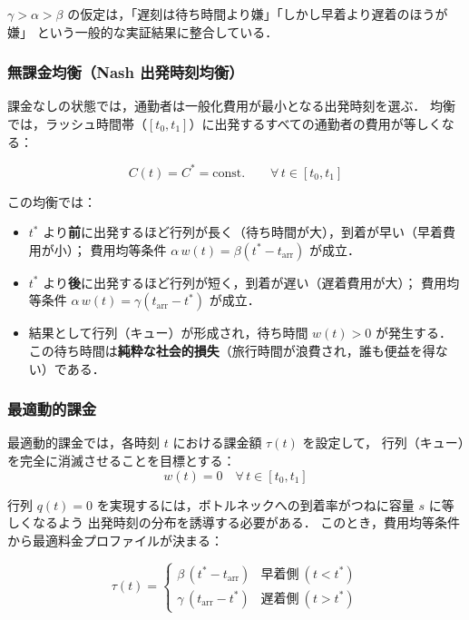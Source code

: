 $\gamma > \alpha > \beta$ の仮定は，「遅刻は待ち時間より嫌」「しかし早着より遅着のほうが嫌」
という一般的な実証結果に整合している．

\subsubsection*{無課金均衡（Nash 出発時刻均衡）}

課金なしの状態では，通勤者は一般化費用が最小となる出発時刻を選ぶ．
均衡では，ラッシュ時間帯（$[t_0, t_1]$）に出発するすべての通勤者の費用が等しくなる：

\begin{equation}
  C(t) = C^* = \text{const.}
  \qquad \forall\, t \in [t_0, t_1]
  \label{eq:departure-equilibrium}
\end{equation}

この均衡では：
\begin{itemize}
  \item $t^*$ より\textbf{前}に出発するほど行列が長く（待ち時間が大），到着が早い（早着費用が小）；
        費用均等条件 $\alpha\, w(t) = \beta(t^* - t_{\text{arr}})$ が成立．
  \item $t^*$ より\textbf{後}に出発するほど行列が短く，到着が遅い（遅着費用が大）；
        費用均等条件 $\alpha\, w(t) = \gamma(t_{\text{arr}} - t^*)$ が成立．
  \item 結果として行列（キュー）が形成され，待ち時間 $w(t) > 0$ が発生する．
        この待ち時間は\textbf{純粋な社会的損失}（旅行時間が浪費され，誰も便益を得ない）である．
\end{itemize}

\subsubsection*{最適動的課金}

最適動的課金では，各時刻 $t$ における課金額 $\tau(t)$ を設定して，
行列（キュー）を完全に消滅させることを目標とする：
\begin{equation}
  w(t) = 0
  \quad \forall\, t \in [t_0, t_1]
  \label{eq:queue-free}
\end{equation}

行列 $q(t) = 0$ を実現するには，ボトルネックへの到着率がつねに容量 $s$ に等しくなるよう
出発時刻の分布を誘導する必要がある．
このとき，費用均等条件から最適料金プロファイルが決まる：

\begin{equation}
  \tau(t) =
  \begin{cases}
    \beta\,(t^* - t_{\text{arr}}) & \text{早着側}\ (t < t^*) \\
    \gamma\,(t_{\text{arr}} - t^*) & \text{遅着側}\ (t > t^*)
  \end{cases}
  \label{eq:optimal-dynamic-toll}
\end{equation}

